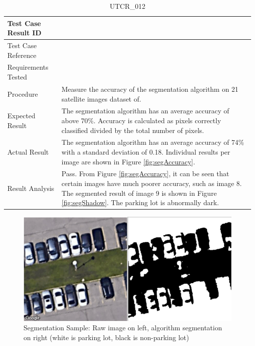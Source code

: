 \documentclass[12pt, titlepage]{article}
\begin{document}
\begin{table}[!h]
\begin{center}
\caption {UTCR\_012}
\label{tab:UTCR_012}
\begin{tabular}{ | m{3.2cm} | m{12.2cm} | } 
\hline
Test Case Result ID & \nameref{tab:UTCR_012} \\ 
\hline
Test Case Reference & \nameref{tab:UTC_012}  \\ 
\hline
Requirements Tested & \nameref{GEN_001} \\ 
\hline
Procedure & Measure the accuracy of the segmentation algorithm on 21 satellite images dataset of. \\ 
\hline
Expected Result & The segmentation algorithm has an average accuracy of above 70\%. Accuracy is calculated as pixels correctly classified divided by the total number of pixels. \\ 
\hline
Actual Result & The segmentation algorithm has an average accuracy of 74\% with a standard deviation of 0.18. Individual results per image are shown in Figure \ref{fig:segAccuracy}. \\ 
\hline
Result Analysis & Pass. From Figure \ref{fig:segAccuracy}, it can be seen that certain images have much poorer accuracy, such as image 8. The segmented result of image 9 is shown in Figure \ref{fig:segShadow}. The parking lot is abnormally dark.  \\ 
\hline
\end{tabular}
\end{center}
\end{table}

\begin{figure}[h!]
  \begin{center} 
  \caption{Segmentation Sample: Raw image on left, algorithm segmentation on right (white is parking lot, black is non-parking lot) }
  \label{fig:segResult}
        \includegraphics[width=1\textwidth]{VnVReport/SegmentationResult.png}
  \end{center}
\end{figure}
\end{document}
